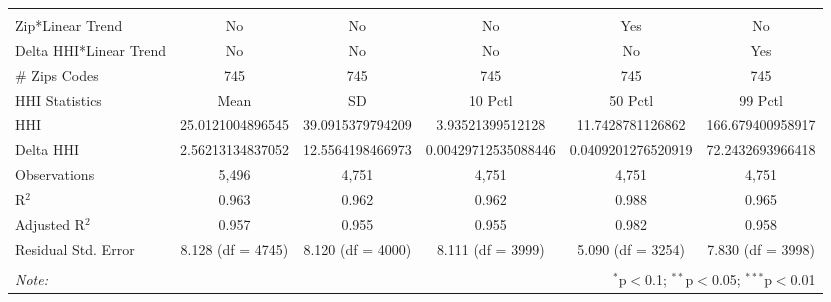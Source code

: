 \begin{table}[H]
{\begin{tabular}{@{\extracolsep{5pt}}lccccc}
   & & & & & \\  

 \hline \\[-1.8ex]  

 Zip*Linear Trend & No & No & No & Yes & No \\  

 Delta HHI*Linear Trend & No & No & No & No & Yes \\  

 # Zips Codes & 745 & 745 & 745 & 745 & 745 \\  

 HHI Statistics & Mean & SD & 10 Pctl & 50 Pctl & 99 Pctl \\  

 HHI & 25.0121004896545 & 39.0915379794209 & 3.93521399512128 & 11.7428781126862 & 166.679400958917 \\  

 Delta HHI & 2.56213134837052 & 12.5564198466973 & 0.00429712535088446 & 0.0409201276520919 & 72.2432693966418 \\  

 Observations & 5,496 & 4,751 & 4,751 & 4,751 & 4,751 \\  

 R$^{2}$ & 0.963 & 0.962 & 0.962 & 0.988 & 0.965 \\  

 Adjusted R$^{2}$ & 0.957 & 0.955 & 0.955 & 0.982 & 0.958 \\  

 Residual Std. Error & 8.128 (df = 4745) & 8.120 (df = 4000) & 8.111 (df = 3999) & 5.090 (df = 3254) & 7.830 (df = 3998) \\  

 \hline  

 \hline \\[-1.8ex]  

 \textit{Note:}  & \multicolumn{5}{r}{$^{*}$p$<$0.1; $^{**}$p$<$0.05; $^{***}$p$<$0.01} \\  

 \end{tabular}}  

 \end{table}  

 



